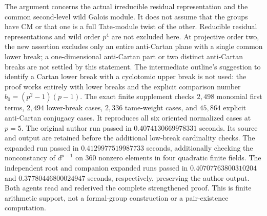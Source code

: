 \begin{remark}
\label{rem:B-RD56-scope}
The argument concerns the actual irreducible residual representation
and the common second-level wild Galois module. It does not assume
that the groups have CM or that one is a full Tate-module twist of
the other. Reducible residual representations and wild order $p^4$ are not
excluded here. At projective order two, the new assertion excludes
only an entire anti-Cartan plane with a single common lower break;
a one-dimensional anti-Cartan part or two distinct anti-Cartan
breaks are not settled by this statement. The intermediate outline's
suggestion to identify a Cartan lower break with a cyclotomic upper
break is not used: the proof works entirely with lower breaks and the
explicit comparison number $b_0=(p^2-1)(p-1)$.
The exact finite supplement
checks $2{,}498$ monomial first terms, $2{,}494$ lower-break cases,
$2{,}336$ tame-weight cases, and $45{,}864$ explicit anti-Cartan
conjugacy cases. It reproduces all six oriented normalized cases
at $p=5$. The original author run passed in $0.4074130669978331$ seconds.
Its source and output are retained before the additional low-break
cardinality checks. The expanded run passed in
$0.4129977519987733$ seconds, additionally checking the nonconstancy
of $d^{p-1}$ on $360$ nonzero elements in four quadratic finite fields.
The independent root and companion expanded runs passed in
$0.40707763800310204$ and $0.37780446800024947$ seconds,
respectively, preserving the author output. Both agents read and
rederived the complete strengthened proof. This is finite arithmetic
support, not a formal-group construction or a pair-existence computation.
\end{remark}
